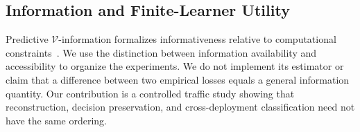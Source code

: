 \subsection{Information and Finite-Learner Utility}
Predictive $\mathcal V$-information formalizes informativeness relative to computational constraints~\cite{vinfo}. We use the distinction between information availability and accessibility to organize the experiments. We do not implement its estimator or claim that a difference between two empirical losses equals a general information quantity. Our contribution is a controlled traffic study showing that reconstruction, decision preservation, and cross-deployment classification need not have the same ordering.
